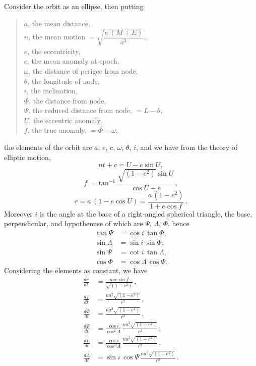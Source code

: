 \documentclass[11pt]{article}
\begin{document}
Consider the orbit as an ellipse, then putting
\begin{quote}
$a$, the mean distance,\\
$n$, the mean motion $= \sqrt{\dfrac{\kappa\,(M+E)}{a^{3}}}$\,,\\
$e$, the eccentricity,\\
$c$, the mean anomaly at epoch,\\
$\omega$, the distance of perigee from node,\\
$\theta$, the longitude of node,\\
$i$, the inclination,\\
$\Phi$, the distance from node,\\
$\Psi$, the reduced distance from node, $= L - \theta$,\\
$U$, the eccentric anomaly,\\
$f$, the true anomaly, $= \Phi - \omega$,
\end{quote}
the elements of the orbit are $a$, $e$, $c$, $\omega$, $\theta$, $i$, and we have from the theory of
elliptic motion,
\[
nt + c = U - e\sin U,
\]
\[
f = \tan^{-1}\frac{\sqrt{(1-e^{2})}\sin U}{\cos U - e}\,,
\]
\[
r = a\,(1 - e\cos U) = \frac{a\,(1-e^{2})}{1 + e\cos f}\,.
\]
Moreover $i$ is the angle at the base of a right-angled spherical triangle, the base,
perpendicular, and hypothenuse of which are $\Psi$, $\Lambda$, $\Phi$, hence
\begin{align*}
\tan\Psi &= \cos i\,\tan\Phi,\\
\sin\Lambda &= \sin i\,\sin\Phi,\\
\sin\Psi &= \cot i\,\tan\Lambda,\\
\cos\Phi &= \cos\Lambda\,\cos\Psi.
\end{align*}
Considering the elements as constant, we have
\begin{align*}
\frac{dr}{dt} &= \frac{na e\sin f}{\sqrt{(1-e^{2})}}\,,\\
\frac{df}{dt} &= \frac{na^{2}\sqrt{(1-e^{2})}}{r^{2}}\,,\\
\frac{d\Phi}{dt} &= \frac{na^{2}\sqrt{(1-e^{2})}}{r^{2}}\,,\\
\frac{d\Psi}{dt} &= \frac{\cos i}{\cos^{2}\Lambda}\,\frac{na^{2}\sqrt{(1-e^{2})}}{r^{2}}\,,\\
\frac{dL}{dt} &= \frac{\cos i}{\cos^{2}\Lambda}\,\frac{na^{2}\sqrt{(1-e^{2})}}{r^{2}}\,,\\
\frac{d\Lambda}{dt} &= \sin i\,\cos\Psi\,\frac{na^{2}\sqrt{(1-e^{2})}}{r^{2}}\,.
\end{align*}
\end{document}
